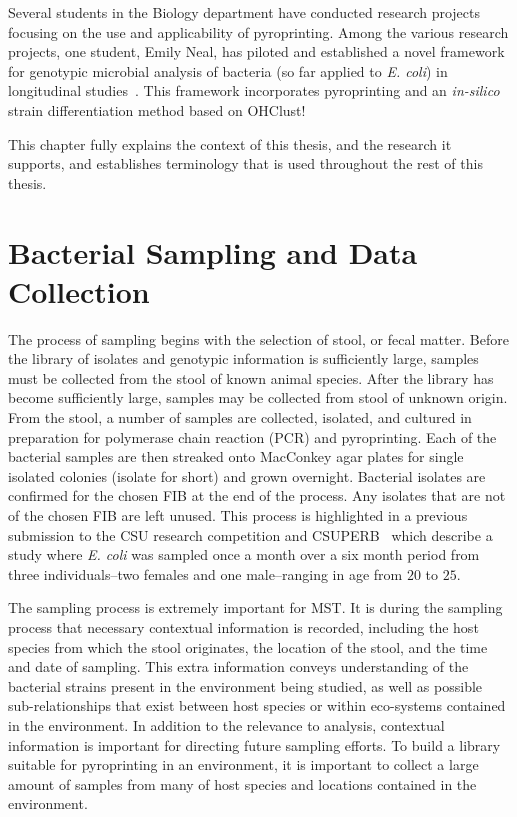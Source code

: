 \documentclass[12pt]{ucthesis}
\begin{document}
   Several students in the Biology department have conducted research projects
   focusing on the use and applicability of pyroprinting. Among the various
   research projects, one student, Emily Neal, has piloted and established a
   novel framework for genotypic microbial analysis of bacteria (so far applied
   to \textit{E. coli}) in longitudinal studies~\cite{Montana:ChronoCluster,
   Montana:CRC}. This framework incorporates pyroprinting and an
   \textit{in-silico} strain differentiation method based on
   \textsf{OHClust!}

   This chapter fully explains the context of this thesis, and the research it
   supports, and establishes terminology that is used throughout the rest of
   this thesis.

   \section{Bacterial Sampling and Data Collection}\label{sec:sampling}
      The process of sampling begins with the selection of stool, or fecal
      matter. Before the library of isolates and genotypic
      information is sufficiently large, samples must be collected from the
      stool of known animal species. After the library has become sufficiently
      large, samples may be collected from stool of unknown origin. From the
      stool, a number of samples are collected, isolated, and
      cultured in preparation for polymerase chain reaction (PCR) and
      pyroprinting. Each of the bacterial samples are then streaked onto
      MacConkey agar plates for single isolated colonies (isolate for short)
      and grown overnight. Bacterial isolates are confirmed for the chosen FIB
      at the end of the process. Any isolates that are not of the
      chosen FIB are left unused. This process is highlighted in a previous
      submission to the CSU research competition and CSUPERB~\cite{Montana:CRC,
      Emily:Demographics} which describe a study where \textit{E. coli} was
      sampled once a month over a six month period from three individuals--two
      females and one male--ranging in age from $20$ to $25$.
      
      The sampling process is extremely important for MST. It is during the
      sampling process that necessary contextual information is recorded,
      including the host species from which the stool originates, the location
      of the stool, and the time and date of sampling. This extra information
      conveys understanding of the bacterial strains present in the environment
      being studied, as well as possible sub-relationships that exist between
      host species or within eco-systems contained in the environment. In
      addition to the relevance to analysis, contextual information is
      important for directing future sampling efforts. To build a library
      suitable for pyroprinting in an environment, it is important to collect a
      large amount of samples from many of host species and locations contained
      in the environment.
\end{document}
